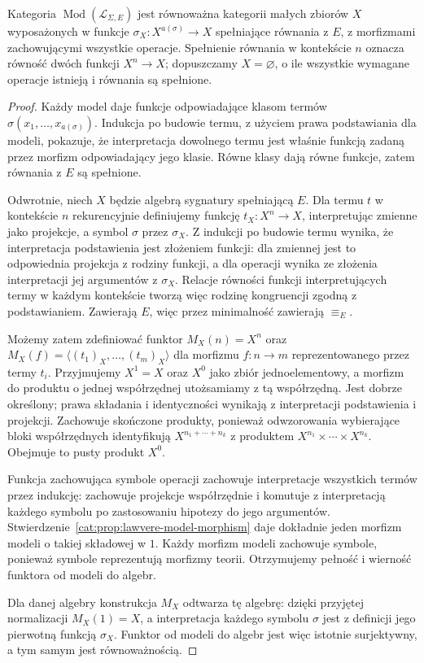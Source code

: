 \begin{twierdzenie}\label{cat:thm:lawvere-equational-models}
Kategoria $\operatorname{Mod}(\mathcal L_{\Sigma,E})$ jest równoważna kategorii małych zbiorów $X$ wyposażonych w funkcje $\sigma_X:X^{a(\sigma)}\to X$ spełniające równania z $E$, z morfizmami zachowującymi wszystkie operacje. Spełnienie równania w kontekście $n$ oznacza równość dwóch funkcji $X^n\to X$; dopuszczamy $X=\varnothing$, o ile wszystkie wymagane operacje istnieją i równania są spełnione.
\end{twierdzenie}
\begin{proof}
Każdy model daje funkcje odpowiadające klasom termów $\sigma(x_1,\ldots,x_{a(\sigma)})$. Indukcja po budowie termu, z użyciem prawa podstawiania dla modeli, pokazuje, że interpretacja dowolnego termu jest właśnie funkcją zadaną przez morfizm odpowiadający jego klasie. Równe klasy dają równe funkcje, zatem równania z $E$ są spełnione.

Odwrotnie, niech $X$ będzie algebrą sygnatury spełniającą $E$. Dla termu $t$ w kontekście $n$ rekurencyjnie definiujemy funkcję $t_X:X^n\to X$, interpretując zmienne jako projekcje, a symbol $\sigma$ przez $\sigma_X$. Z indukcji po budowie termu wynika, że interpretacja podstawienia jest złożeniem funkcji: dla zmiennej jest to odpowiednia projekcja z rodziny funkcji, a dla operacji wynika ze złożenia interpretacji jej argumentów z $\sigma_X$. Relacje równości funkcji interpretujących termy w każdym kontekście tworzą więc rodzinę kongruencji zgodną z podstawianiem. Zawierają $E$, więc przez minimalność zawierają $\equiv_E$.

Możemy zatem zdefiniować funktor $M_X(n)=X^n$ oraz $M_X(f)=\langle(t_1)_X,\ldots,(t_m)_X\rangle$ dla morfizmu $f:n\to m$ reprezentowanego przez termy $t_i$. Przyjmujemy $X^1=X$ oraz $X^0$ jako zbiór jednoelementowy, a morfizm do produktu o jednej współrzędnej utożsamiamy z tą współrzędną. Jest dobrze określony; prawa składania i identyczności wynikają z interpretacji podstawienia i projekcji. Zachowuje skończone produkty, ponieważ odwzorowania wybierające bloki współrzędnych identyfikują $X^{n_1+\cdots+n_k}$ z produktem $X^{n_1}\times\cdots\times X^{n_k}$. Obejmuje to pusty produkt $X^0$.

Funkcja zachowująca symbole operacji zachowuje interpretacje wszystkich termów przez indukcję: zachowuje projekcje współrzędnie i komutuje z interpretacją każdego symbolu po zastosowaniu hipotezy do jego argumentów. Stwierdzenie~\ref{cat:prop:lawvere-model-morphism} daje dokładnie jeden morfizm modeli o takiej składowej w $1$. Każdy morfizm modeli zachowuje symbole, ponieważ symbole reprezentują morfizmy teorii. Otrzymujemy pełność i wierność funktora od modeli do algebr.

Dla danej algebry konstrukcja $M_X$ odtwarza tę algebrę: dzięki przyjętej normalizacji $M_X(1)=X$, a interpretacja każdego symbolu $\sigma$ jest z definicji jego pierwotną funkcją $\sigma_X$. Funktor od modeli do algebr jest więc istotnie surjektywny, a tym samym jest równoważnością.
\end{proof}

